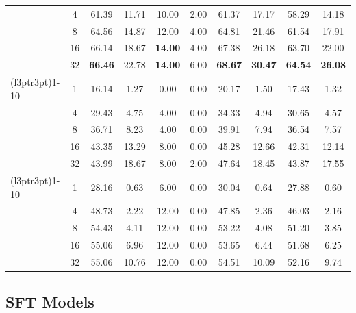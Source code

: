 \begin{table}[H]
\begin{tabular}{lccccccccc}
 & 4  & 61.39 & 11.71 & 10.00 & 2.00 & 61.37 & 17.17 & 58.29 & 14.18 \\
 & 8  & 64.56 & 14.87 & 12.00 & 4.00 & 64.81 & 21.46 & 61.54 & 17.91 \\
 & 16 & 66.14 & 18.67 & \textbf{14.00} & 4.00 & 67.38 & 26.18 & 63.70 & 22.00 \\
 & 32 & \textbf{66.46} & 22.78 & \textbf{14.00} & 6.00 & \textbf{68.67} & \textbf{30.47} & \textbf{64.54} & \textbf{26.08} \\
\cmidrule(l{3pt}r{3pt}){1-10}
\multirow{5}{*}{Qwen3-30B-A3B}
 & 1  & 16.14 & 1.27 & 0.00 & 0.00 & 20.17 & 1.50 & 17.43 & 1.32 \\
 & 4  & 29.43 & 4.75 & 4.00 & 0.00 & 34.33 & 4.94 & 30.65 & 4.57 \\
 & 8  & 36.71 & 8.23 & 4.00 & 0.00 & 39.91 & 7.94 & 36.54 & 7.57 \\
 & 16 & 43.35 & 13.29 & 8.00 & 0.00 & 45.28 & 12.66 & 42.31 & 12.14 \\
 & 32 & 43.99 & 18.67 & 8.00 & 2.00 & 47.64 & 18.45 & 43.87 & 17.55 \\
\cmidrule(l{3pt}r{3pt}){1-10}
\multirow{5}{*}{Llama 3.1-8B}
 & 1  & 28.16 & 0.63 & 6.00 & 0.00 & 30.04 & 0.64 & 27.88 & 0.60 \\
 & 4  & 48.73 & 2.22 & 12.00 & 0.00 & 47.85 & 2.36 & 46.03 & 2.16 \\
 & 8  & 54.43 & 4.11 & 12.00 & 0.00 & 53.22 & 4.08 & 51.20 & 3.85 \\
 & 16 & 55.06 & 6.96 & 12.00 & 0.00 & 53.65 & 6.44 & 51.68 & 6.25 \\
 & 32 & 55.06 & 10.76 & 12.00 & 0.00 & 54.51 & 10.09 & 52.16 & 9.74 \\
\bottomrule
\end{tabular}
\end{table}

\subsection{SFT Models}
\label{app:sft-probe}

